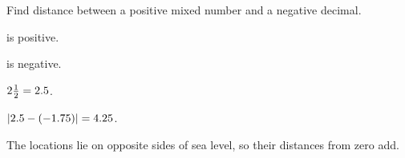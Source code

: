 
Find distance between a positive mixed number and a negative decimal.

\begin{words}
  \item {}is positive.
  \item {}is negative.
\end{words}

\begin{steps}
  \item $2\tfrac{1}{2} = 2.5$.
  \item $\left\lvert 2.5-(-1.75) \right\rvert = 4.25$.
\end{steps}


The locations lie on opposite sides of sea level, so their distances from zero add.
